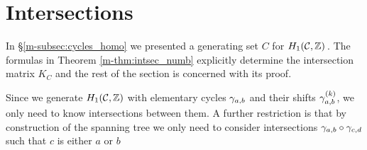\documentclass[main.tex]{subfiles}
\begin{document}
  \section{Intersections}\label{sec:intersections}

  In \S \ref{m-subsec:cycles_homo} we presented a generating set $C$ for $H_1(\mathcal{C},\mathbb{Z})$\,.
  The formulas in Theorem \ref{m-thm:intsec_numb} explicitly determine the
  intersection matrix $K_C$ and
  the rest of the section is concerned with its proof.


  Since we generate $H_1(\mathcal{C},\mathbb{Z})$ with elementary cycles $\gamma_{a,b}$ and their shifts $\gamma_{a,b}^{(k)}$,
  we only need to know intersections between them. A further restriction is that by construction
  of the spanning tree we only need to
  consider intersections $\gamma_{a,b}\circ\gamma_{c,d}$ such that $c$ is either $a$ or $b$
\end{document}
